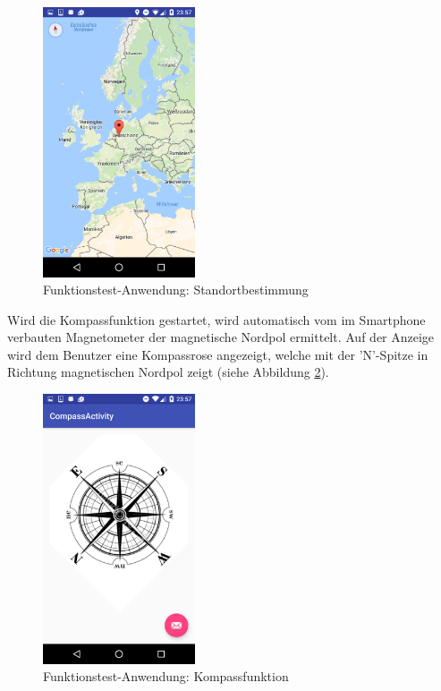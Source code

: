 \begin{figure}[h]
	\centering
	\includegraphics[width=0.4\textwidth]{Bilder/Screenshots/Screenshot_20170214-235726.PNG}
	\caption{Funktionstest-Anwendung: Standortbestimmung}
	\label{fig:GPS}
\end{figure}

Wird die Kompassfunktion gestartet, wird automatisch vom im Smartphone verbauten Magnetometer der magnetische Nordpol ermittelt. Auf der Anzeige wird dem Benutzer eine Kompassrose angezeigt, welche mit der 'N'-Spitze in Richtung magnetischen Nordpol zeigt (siehe Abbildung \ref{fig:Compass}).
\clearpage

\begin{figure}[h]
	\centering
	\includegraphics[width=0.4\textwidth]{Bilder/Screenshots/Screenshot_20170214-235753.PNG}
	\caption{Funktionstest-Anwendung: Kompassfunktion}
	\label{fig:Compass}
\end{figure}

